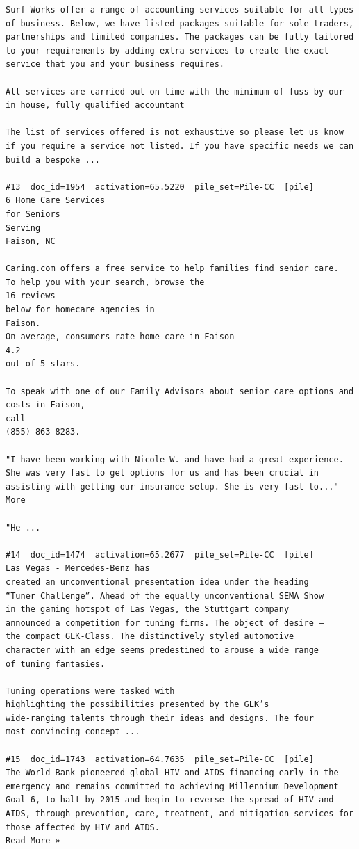 \begin{verbatim}
Surf Works offer a range of accounting services suitable for all types of business. Below, we have listed packages suitable for sole traders, partnerships and limited companies. The packages can be fully tailored to your requirements by adding extra services to create the exact service that you and your business requires.

All services are carried out on time with the minimum of fuss by our in house, fully qualified accountant

The list of services offered is not exhaustive so please let us know if you require a service not listed. If you have specific needs we can build a bespoke ...

#13  doc_id=1954  activation=65.5220  pile_set=Pile-CC  [pile]
6 Home Care Services
for Seniors
Serving
Faison, NC

Caring.com offers a free service to help families find senior care.
To help you with your search, browse the
16 reviews
below for homecare agencies in
Faison.
On average, consumers rate home care in Faison
4.2
out of 5 stars.

To speak with one of our Family Advisors about senior care options and costs in Faison,
call
(855) 863-8283.

"I have been working with Nicole W. and have had a great experience. She was very fast to get options for us and has been crucial in assisting with getting our insurance setup. She is very fast to..." More

"He ...

#14  doc_id=1474  activation=65.2677  pile_set=Pile-CC  [pile]
Las Vegas - Mercedes-Benz has
created an unconventional presentation idea under the heading
“Tuner Challenge”. Ahead of the equally unconventional SEMA Show
in the gaming hotspot of Las Vegas, the Stuttgart company
announced a competition for tuning firms. The object of desire –
the compact GLK-Class. The distinctively styled automotive
character with an edge seems predestined to arouse a wide range
of tuning fantasies.

Tuning operations were tasked with
highlighting the possibilities presented by the GLK’s
wide-ranging talents through their ideas and designs. The four
most convincing concept ...

#15  doc_id=1743  activation=64.7635  pile_set=Pile-CC  [pile]
The World Bank pioneered global HIV and AIDS financing early in the emergency and remains committed to achieving Millennium Development Goal 6, to halt by 2015 and begin to reverse the spread of HIV and AIDS, through prevention, care, treatment, and mitigation services for those affected by HIV and AIDS.
Read More »


\end{verbatim}
